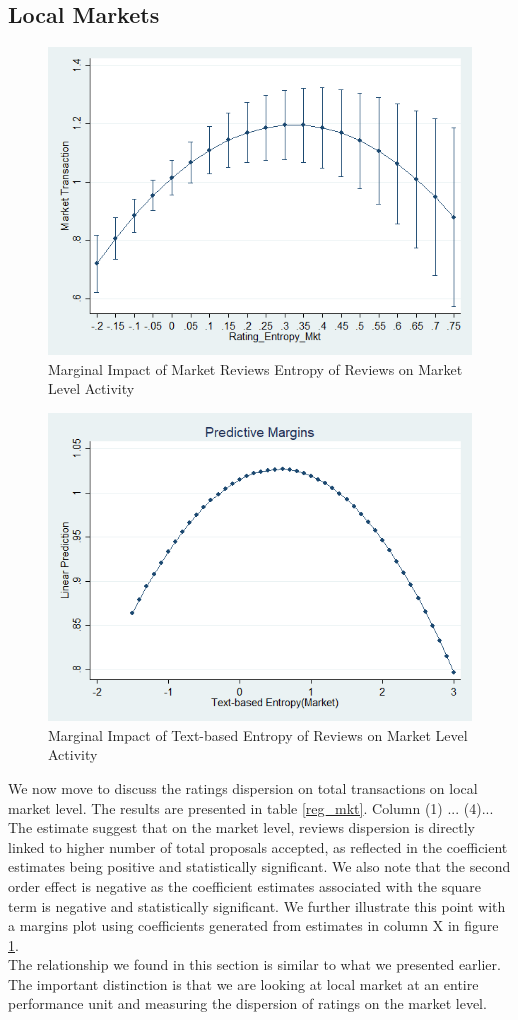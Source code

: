 \documentclass[msom,blindrev]{informs3}
\begin{document}
\subsection{Local Markets}

\begin{figure}
	\centering
	\includegraphics[width=0.7\linewidth]{marginsplot_entmkt.png}
	\caption{Marginal Impact of Market Reviews Entropy of Reviews on Market Level Activity}
	\label{marginsplot_mkt_entmkt}
\end{figure}
\begin{figure}
	\centering
	\includegraphics[width=0.7\linewidth]{marginsplot_text_ent_mkt_noci.png}
	\caption{Marginal Impact of Text-based Entropy of Reviews on Market Level Activity}
	\label{marginsplot_text_ent_mkt}
\end{figure}
We now move to discuss the ratings dispersion on total transactions on local market level. The results are presented in table \ref{reg_mkt}. Column (1) ... (4)... The estimate suggest that on the market level, reviews dispersion is directly linked to higher number of total proposals accepted, as reflected in the coefficient estimates being positive and statistically significant. We also note that the second order effect is negative as the coefficient estimates associated with the square term is negative and statistically significant. We further illustrate this point with a margins plot using coefficients generated from estimates in column X in figure \ref{marginsplot_mkt_entmkt}. \\
The relationship we found in this section is similar to what we presented earlier. The important distinction is that we are looking at local market at an entire performance unit and measuring the dispersion of ratings on the market level.
\end{document}
